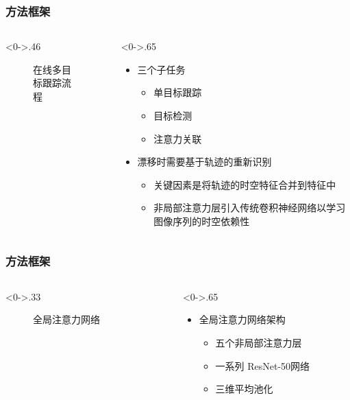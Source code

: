 \begin{frame}
	\frametitle{方法框架}
	\begin{columns}[T] %
		\begin{column}<0->{.46\textwidth}
			\begin{figure}[thpb]
				\centering
				\caption{在线多目标跟踪流程}
			\end{figure}
		\end{column}
		\hfill%
		\begin{column}<0->{.65\textwidth}
			\begin{itemize}
				\item<1-> 三个子任务
				\begin{itemize}
					\item<1-> 单目标跟踪
					\item<1-> 目标检测
					\item<1-> 注意力关联
				\end{itemize}

				\item <1-> 漂移时需要基于轨迹的重新识别
				\begin{itemize}
					\item<1-> 关键因素是将轨迹的时空特征合并到特征中
					\item<1-> 非局部注意力层引入传统卷积神经网络以学习图像序列的时空依赖性
				\end{itemize}
			\end{itemize}
		\end{column}%
	\end{columns}
\end{frame}


\begin{frame}
	\frametitle{方法框架}
	\begin{columns}[T] %
		\begin{column}<0->{.33\textwidth}
			\begin{figure}[thpb]
				\centering
				\caption{全局注意力网络}
			\end{figure}
		\end{column}
		\hfill%
		\begin{column}<0->{.65\textwidth}
			\begin{itemize}
				\item<1-> 全局注意力网络架构
				\begin{itemize}
					\item<1-> 五个非局部注意力层
					\item<1-> 一系列 ResNet-50网络
					\item<1-> 三维平均池化
				\end{itemize}

			\end{itemize}
		\end{column}%
	\end{columns}
\end{frame}


